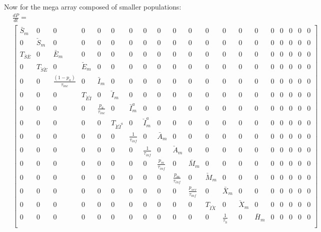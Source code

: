 \documentclass[notitlepage, superscriptaddress]{revtex4-2}
\begin{document}
Now for the mega array composed of smaller populations:
\begin{eqnarray}
&\frac{dP}{dt} = \nonumber \\
&\begin{bmatrix}
\bar{S}_{m} & 0 & 0 & 0 & 0 & 0 & 0 & 0 & 0 & 0 & 0 & 0 & 0 & 0 & 0 & 0 & 0 & 0 & 0 & 0 \\[.1cm] 
0 & \check{S}_{m} & 0 & 0 & 0 & 0 & 0 & 0 & 0 & 0 & 0 & 0 & 0 & 0 & 0 & 0 & 0 & 0 & 0 & 0 \\[.1cm] 
T_{\bar{S}\bar{E}} & 0 & \bar{E}_{m} & 0 & 0 & 0 & 0 & 0 & 0 & 0 & 0 & 0 & 0 & 0 & 0 & 0 & 0 & 0 & 0 & 0 \\[.1cm] 
0 & T_{\check{S}\check{E}} & 0 & \check{E}_{m} & 0 & 0 & 0 & 0 & 0 & 0 & 0 & 0 & 0 & 0 & 0 & 0 & 0 & 0 & 0 & 0 \\[.1cm] 
0 & 0 & \frac{(1-p_{a})}{\tau_{inc}} & 0 & \bar{I}_{m} & 0 & 0 & 0 & 0 & 0 & 0 & 0 & 0 & 0 & 0 & 0 & 0 & 0 & 0 & 0 \\[.1cm] 
0 & 0 & 0 & T_{\check{E}\check{I}} & 0 & \check{I}_{m} & 0 & 0 & 0 & 0 & 0 & 0 & 0 & 0 & 0 & 0 & 0 & 0 & 0 & 0 \\[.1cm] 
0 & 0 & 0 & 0 & \frac{p_{a}}{\tau_{inc}} & 0 & \bar{I}^{a}_{m} & 0 & 0 & 0 & 0 & 0 & 0 & 0 & 0 & 0 & 0 & 0 & 0 & 0 \\[.1cm] 
0 & 0 & 0 & 0 & 0 & T_{\check{E}\check{I}^{a}} & 0 & \check{I}^{a}_{m} & 0 & 0 & 0 & 0 & 0 & 0 & 0 & 0 & 0 & 0 & 0 & 0 \\[.1cm] 
0 & 0 & 0 & 0 & 0 & 0 & \frac{1}{\tau_{inf}} & 0 & \bar{A}_{m} & 0 & 0 & 0 & 0 & 0 & 0 & 0 & 0 & 0 & 0 & 0 \\[.1cm] 
0 & 0 & 0 & 0 & 0 & 0 & 0 & \frac{1}{\tau_{inf}} & 0 & \check{A}_{m} & 0 & 0 & 0 & 0 & 0 & 0 & 0 & 0 & 0 & 0 \\[.1cm] 
0 & 0 & 0 & 0 & 0 & 0 & 0 & 0 & \frac{p_{m}}{\tau_{inf}} & 0 & \bar{M}_{m} & 0 & 0 & 0 & 0 & 0 & 0 & 0 & 0 & 0 \\[.1cm] 
0 & 0 & 0 & 0 & 0 & 0 & 0 & 0 & 0 & \frac{p_{m}}{\tau_{inf}} & 0 & \check{M}_{m} & 0 & 0 & 0 & 0 & 0 & 0 & 0 & 0 \\[.1cm] 
0 & 0 & 0 & 0 & 0 & 0 & 0 & 0 & 0 & 0 & \frac{p_{sev}}{\tau_{inf}} & 0 & \bar{X}_{m} & 0 & 0 & 0 & 0 & 0 & 0 & 0 \\[.1cm] 
0 & 0 & 0 & 0 & 0 & 0 & 0 & 0 & 0 & 0 & 0 & T_{\check{I}\check{X}} & 0 & \check{X}_{m} & 0 & 0 & 0 & 0 & 0 & 0 \\[.1cm] 
0 & 0 & 0 & 0 & 0 & 0 & 0 & 0 & 0 & 0 & 0 & 0 & \frac{1}{\tau_{h}} & 0 & \bar{H}_{m} & 0 & 0 & 0 & 0 & 0 \\[.1cm] 

\end{bmatrix}
\end{eqnarray}
\end{document}
